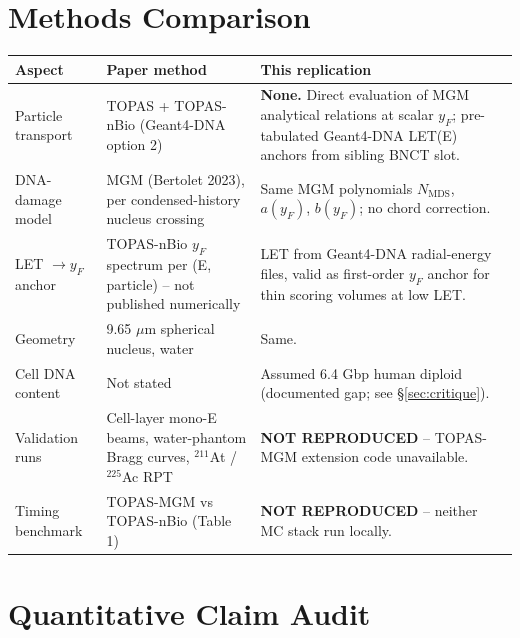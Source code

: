 \documentclass[11pt]{article}
\begin{document}
\section{Methods Comparison}
\begin{longtable}{p{3.2cm}p{6cm}p{6cm}}
\toprule
Aspect & Paper method & This replication \\
\midrule
Particle transport & TOPAS + TOPAS-nBio (Geant4-DNA option 2) & \textbf{None.} Direct evaluation of MGM analytical relations at scalar $y_F$; pre-tabulated Geant4-DNA LET(E) anchors from sibling BNCT slot. \\
DNA-damage model & MGM (Bertolet 2023), per condensed-history nucleus crossing & Same MGM polynomials $N_{\text{MDS}}$, $a(y_F)$, $b(y_F)$; no chord correction. \\
LET $\to y_F$ anchor & TOPAS-nBio $y_F$ spectrum per (E, particle) -- not published numerically & LET from Geant4-DNA radial-energy files, valid as first-order $y_F$ anchor for thin scoring volumes at low LET. \\
Geometry & 9.65 $\mu$m spherical nucleus, water & Same. \\
Cell DNA content & Not stated & Assumed 6.4 Gbp human diploid (documented gap; see \S\ref{sec:critique}). \\
Validation runs & Cell-layer mono-E beams, water-phantom Bragg curves, $^{211}$At / $^{225}$Ac RPT & \textbf{NOT REPRODUCED} -- TOPAS-MGM extension code unavailable. \\
Timing benchmark & TOPAS-MGM vs TOPAS-nBio (Table 1) & \textbf{NOT REPRODUCED} -- neither MC stack run locally. \\
\bottomrule
\end{longtable}

\section{Quantitative Claim Audit}
\end{document}
